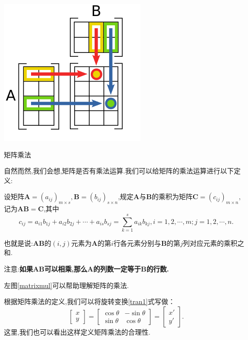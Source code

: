 \begin{marginfigure}[9em]
	\includegraphics[width=\marginparwidth]{figures/matrixmul.png}
	\caption{矩阵乘法}\label{matrixmul}
\end{marginfigure}

自然而然,我们会想,矩阵是否有乘法运算.我们可以给矩阵的乘法运算进行以下定义:
\begin{definition}
	设矩阵$\mathbf{A}=\left(a_{ij}\right)_{m\times s},\mathbf{B}=\left(b_{ij}\right)_{s\times n}$,规定$\mathbf{A}$与$\mathbf{B}$的乘积为矩阵$\mathbf{C}=\left(c_{ij}\right)_{m\times n},$记为$\mathbf{AB=C}$,其中
	\[
		c_{ij}=a_{i1}b_{1j}+a_{i2}b_{2j}+\cdots+a_{is}b_{sj}=\sum_{k=1}^{s}a_{ik}b_{kj},i=1,2,\cdots ,m;j=1,2,\cdots ,n.
	\]
\end{definition}

也就是说:$\mathbf{AB}$的$\left(i,j\right)$元素为$\mathbf{A}$的第$i$行各元素分别与$\mathbf{B}$的第$j$列对应元素的乘积之和.

注意:\textbf{如果$\mathbf{AB}$可以相乘,那么$\mathbf{A}$的列数一定等于$\mathbf{B}$的行数.}

左图\ref{matrixmul}可以帮助理解矩阵的乘法.

根据矩阵乘法的定义,我们可以将旋转变换\eqref{tran1}式写做：
\[
	\begin{bmatrix}
		x \\
		y
	\end{bmatrix}
	=\begin{bmatrix}
		\cos\theta & -\sin\theta \\
		\sin\theta & \cos\theta
	\end{bmatrix}
	=\begin{bmatrix}
		x' \\
		y'
	\end{bmatrix}.
\]
这里,我们也可以看出这样定义矩阵乘法的合理性.

